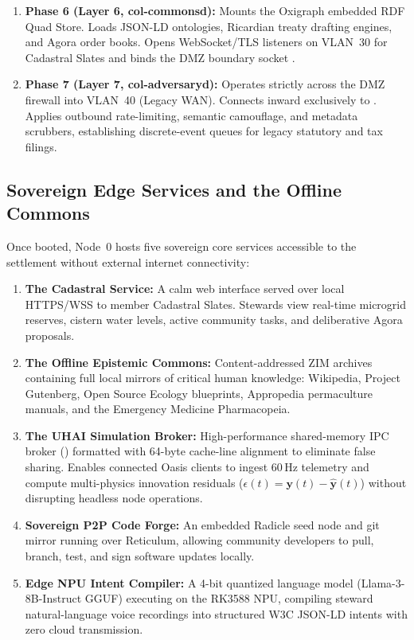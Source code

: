 \begin{enumerate}
    \item \textbf{Phase 6 (Layer 6, col-commonsd):} Mounts the Oxigraph embedded RDF Quad Store. Loads JSON-LD ontologies, Ricardian treaty drafting engines, and Agora order books. Opens WebSocket/TLS listeners on VLAN~30 for Cadastral Slates and binds the DMZ boundary socket .
    \item \textbf{Phase 7 (Layer 7, col-adversaryd):} Operates strictly across the DMZ firewall into VLAN~40 (Legacy WAN). Connects inward exclusively to . Applies outbound rate-limiting, semantic camouflage, and metadata scrubbers, establishing discrete-event queues for legacy statutory and tax filings.
\end{enumerate}

\subsection{Sovereign Edge Services and the Offline Commons}
\label{subsec:edge_services}

Once booted, Node~0 hosts five sovereign core services accessible to the settlement without external internet connectivity:
\begin{enumerate}
    \item \textbf{The Cadastral Service:} A calm web interface served over local HTTPS/WSS to member Cadastral Slates. Stewards view real-time microgrid reserves, cistern water levels, active community tasks, and deliberative Agora proposals.
    \item \textbf{The Offline Epistemic Commons:} Content-addressed ZIM archives containing full local mirrors of critical human knowledge: Wikipedia, Project Gutenberg, Open Source Ecology blueprints, Appropedia permaculture manuals, and the Emergency Medicine Pharmacopeia.
    \item \textbf{The UHAI Simulation Broker:} High-performance shared-memory IPC broker () formatted with 64-byte cache-line alignment to eliminate false sharing. Enables connected Oasis clients to ingest 60\,Hz telemetry and compute multi-physics innovation residuals ($\epsilon(t) = \mathbf{y}(t) - \hat{\mathbf{y}}(t)$) without disrupting headless node operations.
    \item \textbf{Sovereign P2P Code Forge:} An embedded Radicle seed node and git mirror running over Reticulum, allowing community developers to pull, branch, test, and sign software updates locally.
    \item \textbf{Edge NPU Intent Compiler:} A 4-bit quantized language model (Llama-3-8B-Instruct GGUF) executing on the RK3588 NPU, compiling steward natural-language voice recordings into structured W3C JSON-LD intents with zero cloud transmission.
\end{enumerate}

